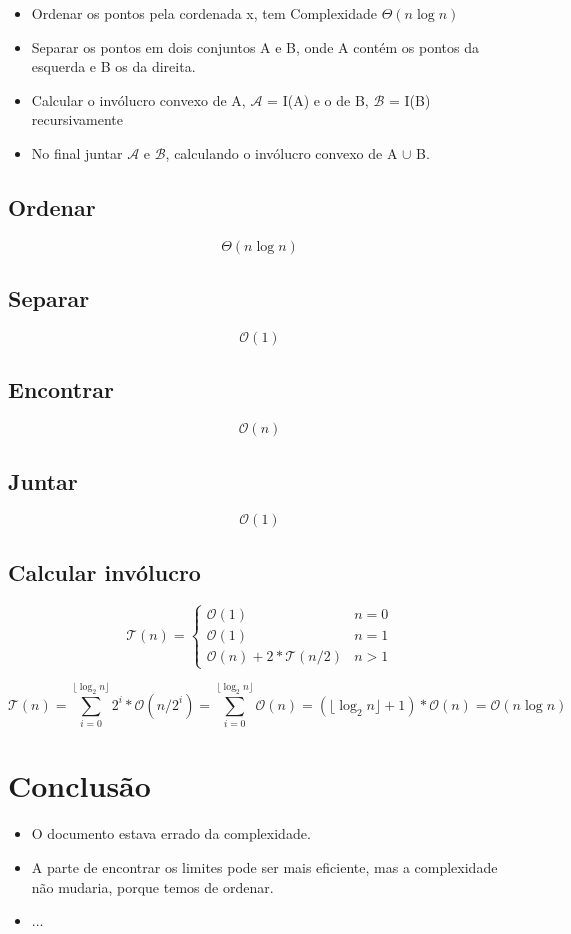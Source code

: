 \documentclass[11pt]{article}
\begin{document}
\begin{itemize}
    \item Ordenar os pontos pela cordenada x, tem Complexidade $\Theta(n\log{}n)$
    \item Separar os pontos em dois conjuntos A e B, onde A contém os pontos da esquerda e B os da direita.
    \item Calcular o invólucro convexo de A, $\mathcal{A}$ = I(A) e o de B, $\mathcal{B}$ = I(B) recursivamente
    \item No final juntar $\mathcal{A}$ e $\mathcal{B}$, calculando o invólucro convexo de A $\cup$ B.
\end{itemize}

\subsection{Ordenar}
$$\Theta(n\log{}n)$$

\subsection{Separar}
$$\mathcal{O}(1)$$

\subsection{Encontrar}
$$\mathcal{O}(n)$$

\subsection{Juntar}
$$\mathcal{O}(1)$$

\subsection{Calcular invólucro}
$$
    \mathcal{T}(n) = 
        \begin{cases}
            \mathcal{O}(1)                      & n = 0\\
            \mathcal{O}(1)                      & n = 1\\
            \mathcal{O}(n) + 2*\mathcal{T}(n/2) & n > 1
        \end{cases}
$$

$$
    \mathcal{T}(n) = \sum_{i=0}^{\lfloor\log_{2}n\rfloor} 2^i*\mathcal{O}(n/2^i)
    = \sum_{i=0}^{\lfloor\log_{2}n\rfloor} \mathcal{O}(n)
    = (\lfloor\log_{2}n\rfloor + 1)*\mathcal{O}(n)
    = \mathcal{O}(n\log{n})
$$


\section{Conclusão}
\begin{itemize}
    \item O documento estava errado da complexidade.
    \item A parte de encontrar os limites pode ser mais eficiente, 
        mas a complexidade não mudaria, porque temos de ordenar.
    \item ...
\end{itemize}
\end{document}
